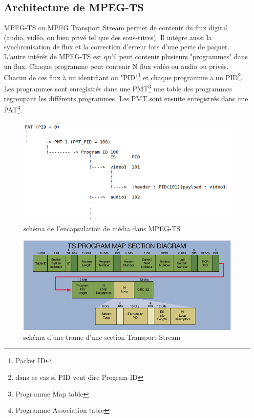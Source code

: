 \subsection{Architecture de MPEG-TS}
MPEG-TS ou MPEG Transport Stream permet de contenir du flux digital (audio, vidéo, ou bien privé tel que des sous-titres). Il intègre aussi la synchronisation de flux et la correction  d'erreur lors d'une perte de paquet. L'autre intérêt de MPEG-TS est qu'il peut contenir plusieurs "programmes" dans un flux. Chaque programme peut contenir N flux vidéo ou audio ou privés. Chacun de ces flux à un identifiant ou "PID"\footnote{Packet ID} et chaque programme a un PID\footnote{dans ce cas si PID veut dire Program ID}. Les programmes sont enregistrés dans une PMT\footnote{Programme Map table} une table des programmes regroupant les différents programmes. Les PMT sont ensuite enregistrés dans une PAT\footnote{Programme Association table}.

\begin{figure}[!h]
  \centering
  \includegraphics[scale=0.7]{figures/ts_diag}
  \caption{schéma de l'encapsulation de média dans MPEG-TS}
\end{figure}

\begin{figure}[!h]
  \centering
  \includegraphics[scale=0.6]{figures/ts}
  \caption{schéma d'une trame d'une section Transport Stream}
\end{figure}

